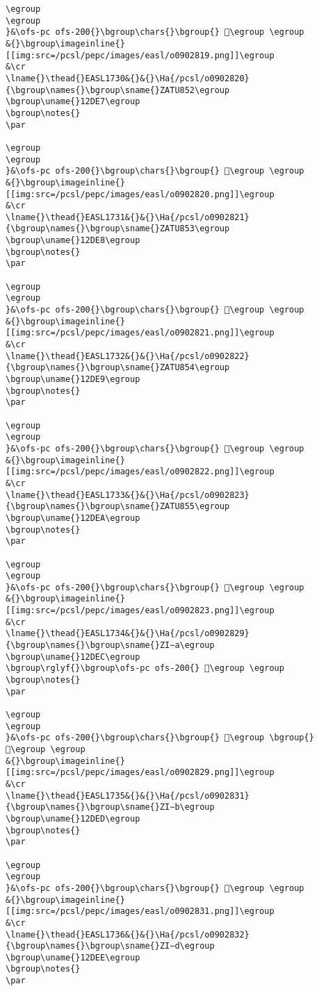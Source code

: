 \begin{verbatim}
\egroup
\egroup
}&\ofs-pc ofs-200{}\bgroup\chars{}\bgroup{} 𒷦\egroup \egroup
&{}\bgroup\imageinline{}[[img:src=/pcsl/pepc/images/easl/o0902819.png]]\egroup
&\cr
\lname{}\thead{}EASL1730&{}&{}\Ha{/pcsl/o0902820}{\bgroup\names{}\bgroup\sname{}ZATU852\egroup
\bgroup\uname{}12DE7\egroup
\bgroup\notes{}
\par 

\egroup
\egroup
}&\ofs-pc ofs-200{}\bgroup\chars{}\bgroup{} 𒷧\egroup \egroup
&{}\bgroup\imageinline{}[[img:src=/pcsl/pepc/images/easl/o0902820.png]]\egroup
&\cr
\lname{}\thead{}EASL1731&{}&{}\Ha{/pcsl/o0902821}{\bgroup\names{}\bgroup\sname{}ZATU853\egroup
\bgroup\uname{}12DE8\egroup
\bgroup\notes{}
\par 

\egroup
\egroup
}&\ofs-pc ofs-200{}\bgroup\chars{}\bgroup{} 𒷨\egroup \egroup
&{}\bgroup\imageinline{}[[img:src=/pcsl/pepc/images/easl/o0902821.png]]\egroup
&\cr
\lname{}\thead{}EASL1732&{}&{}\Ha{/pcsl/o0902822}{\bgroup\names{}\bgroup\sname{}ZATU854\egroup
\bgroup\uname{}12DE9\egroup
\bgroup\notes{}
\par 

\egroup
\egroup
}&\ofs-pc ofs-200{}\bgroup\chars{}\bgroup{} 𒷩\egroup \egroup
&{}\bgroup\imageinline{}[[img:src=/pcsl/pepc/images/easl/o0902822.png]]\egroup
&\cr
\lname{}\thead{}EASL1733&{}&{}\Ha{/pcsl/o0902823}{\bgroup\names{}\bgroup\sname{}ZATU855\egroup
\bgroup\uname{}12DEA\egroup
\bgroup\notes{}
\par 

\egroup
\egroup
}&\ofs-pc ofs-200{}\bgroup\chars{}\bgroup{} 𒷪\egroup \egroup
&{}\bgroup\imageinline{}[[img:src=/pcsl/pepc/images/easl/o0902823.png]]\egroup
&\cr
\lname{}\thead{}EASL1734&{}&{}\Ha{/pcsl/o0902829}{\bgroup\names{}\bgroup\sname{}ZI∼a\egroup
\bgroup\uname{}12DEC\egroup
\bgroup\rglyf{}\bgroup\ofs-pc ofs-200{} 𒷬\egroup \egroup
\bgroup\notes{}
\par 

\egroup
\egroup
}&\ofs-pc ofs-200{}\bgroup\chars{}\bgroup{} 𒷫\egroup \bgroup{} 𒷬\egroup \egroup
&{}\bgroup\imageinline{}[[img:src=/pcsl/pepc/images/easl/o0902829.png]]\egroup
&\cr
\lname{}\thead{}EASL1735&{}&{}\Ha{/pcsl/o0902831}{\bgroup\names{}\bgroup\sname{}ZI∼b\egroup
\bgroup\uname{}12DED\egroup
\bgroup\notes{}
\par 

\egroup
\egroup
}&\ofs-pc ofs-200{}\bgroup\chars{}\bgroup{} 𒷭\egroup \egroup
&{}\bgroup\imageinline{}[[img:src=/pcsl/pepc/images/easl/o0902831.png]]\egroup
&\cr
\lname{}\thead{}EASL1736&{}&{}\Ha{/pcsl/o0902832}{\bgroup\names{}\bgroup\sname{}ZI∼d\egroup
\bgroup\uname{}12DEE\egroup
\bgroup\notes{}
\par 


\end{verbatim}
